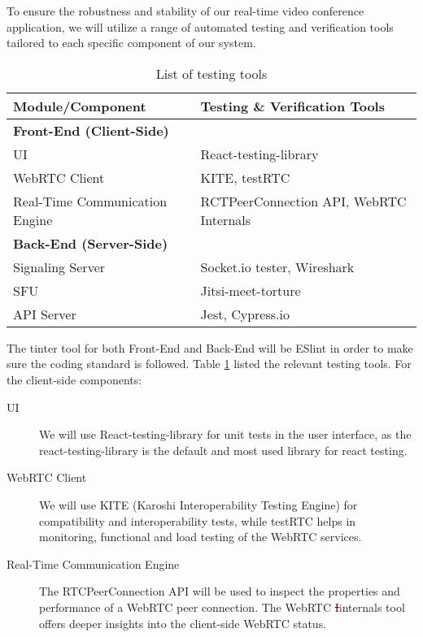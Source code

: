 \documentclass[12pt, titlepage]{article}
\newcommand{\rt}[1]{\textcolor{red}{#1}}
\begin{document}
To ensure the robustness and stability of our real-time video conference
application, we will utilize a range of automated testing and verification tools
tailored to each specific component of our system.

\begin{table}[h]
  \centering
  \begin{tabularx}{1.0\linewidth}{ll} \toprule
    \textbf{Module/Component}            & \textbf{Testing \& Verification Tools}        \\ \midrule
    \multicolumn{2}{l}{\textbf{Front-End (Client-Side)}}                                    \\
    UI                             & React-testing-library                   \\
    WebRTC Client                  & KITE, testRTC                           \\
    Real-Time Communication Engine & RCTPeerConnection API, WebRTC Internals \\ \midrule
    \multicolumn{2}{l}{\textbf{Back-End (Server-Side)}}                                     \\
    Signaling Server               & Socket.io tester, Wireshark             \\
    SFU                            & Jitsi-meet-torture                      \\
    API Server                     & Jest, Cypress.io                        \\ \bottomrule
  \end{tabularx}
  \caption{List of testing tools}
  \label{tab:testingtools}
\end{table}

The tinter tool for both Front-End and Back-End will be ESlint in order to make
sure the coding standard is followed. Table \ref{tab:testingtools} listed the
relevant testing tools. For the client-side components:
\begin{description}
\item[UI] We will use React-testing-library for unit tests in the user interface,
  as the react-testing-library is the default and most used library for react
  testing.
\item[WebRTC Client] We will use KITE (Karoshi Interoperability Testing Engine)
  for compatibility and interoperability tests, while testRTC helps in
  monitoring, functional and load testing of the WebRTC services.
\item[Real-Time Communication Engine] The RTCPeerConnection API will be used to
  inspect the properties and performance of a WebRTC peer connection. The WebRTC
  \sout{I}\rt{i}nternals tool offers deeper insights into the client-side WebRTC status.
\end{description}
\end{document}
